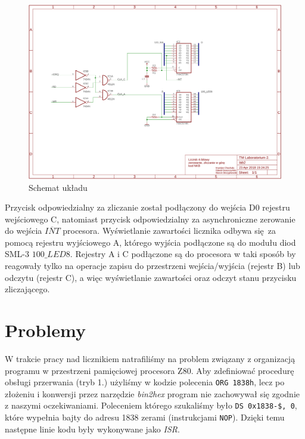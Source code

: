 \documentclass[fleqn]{article}
\begin{document}
\begin{figure}[H]
	\centering
	\includegraphics[width=\textwidth]{img/schematic.pdf}
	\caption{Schemat układu}
	\label{fig:schematic}
\end{figure}

Przycisk odpowiedzialny za zliczanie został podłączony do wejścia D0 rejestru wejściowego C, natomiast przycisk odpowiedzialny za asynchroniczne zerowanie do wejścia $\overline{INT}$ procesora.
Wyświetlanie zawartości licznika odbywa się za pomocą rejestru wyjściowego A, którego wyjścia podłączone są do modułu diod SML-3 $\textit{100\_LED8}$. Rejestry A i C podłączone są do procesora w taki sposób by reagowały tylko na operacje zapisu do przestrzeni wejścia/wyjścia (rejestr B) lub odczytu (rejestr C), a więc wyświetlanie zawartości oraz odczyt stanu przycisku zliczającego.

\section{Problemy}
W trakcie pracy nad licznikiem natrafiliśmy na problem związany z organizacją programu w przestrzeni pamięciowej procesora Z80. Aby zdefiniować procedurę obsługi przerwania (tryb 1.) użyliśmy w kodzie polecenia \lstinline|ORG 1838h|, lecz po złożeniu i konwersji przez narzędzie \textit{bin2hex} program nie zachowywał się zgodnie z naszymi oczekiwaniami. Poleceniem którego szukaliśmy było \lstinline|DS 0x1838-$, 0|, które wypełnia bajty do adresu 1838 zerami (instrukcjami \lstinline|NOP|). Dzięki temu następne linie kodu były wykonywane jako \textit{ISR}.
\end{document}
